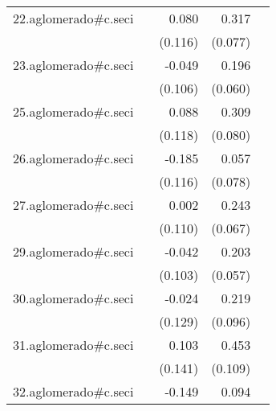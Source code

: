 {\begin{longtable}{l*{4}{D{.}{.}{-1}}}
\addlinespace
22.aglomerado#c.seci&                     &       0.080         &       0.317\sym{***}&                     \\
            &                     &     (0.116)         &     (0.077)         &                     \\
\addlinespace
23.aglomerado#c.seci&                     &      -0.049         &       0.196\sym{**} &                     \\
            &                     &     (0.106)         &     (0.060)         &                     \\
\addlinespace
25.aglomerado#c.seci&                     &       0.088         &       0.309\sym{***}&                     \\
            &                     &     (0.118)         &     (0.080)         &                     \\
\addlinespace
26.aglomerado#c.seci&                     &      -0.185         &       0.057         &                     \\
            &                     &     (0.116)         &     (0.078)         &                     \\
\addlinespace
27.aglomerado#c.seci&                     &       0.002         &       0.243\sym{***}&                     \\
            &                     &     (0.110)         &     (0.067)         &                     \\
\addlinespace
29.aglomerado#c.seci&                     &      -0.042         &       0.203\sym{***}&                     \\
            &                     &     (0.103)         &     (0.057)         &                     \\
\addlinespace
30.aglomerado#c.seci&                     &      -0.024         &       0.219\sym{*}  &                     \\
            &                     &     (0.129)         &     (0.096)         &                     \\
\addlinespace
31.aglomerado#c.seci&                     &       0.103         &       0.453\sym{***}&                     \\
            &                     &     (0.141)         &     (0.109)         &                     \\
\addlinespace
32.aglomerado#c.seci&                     &      -0.149         &       0.094         &                     \\

\end{longtable}}
